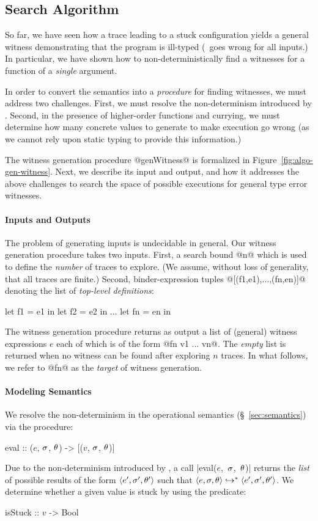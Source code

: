 \subsection{Search Algorithm}
\label{sec:search-algorithm}
%
So far, we have seen how a trace leading to a stuck configuration yields
a general witness demonstrating that the program is ill-typed (\ie\ goes
wrong for all inputs.)
In particular, we have shown how to non-deterministically find a witnesses
for a function of a \emph{single} argument.

In order to convert the semantics into a \emph{procedure} for finding
witnesses, we must address two challenges.
%
First, we must resolve the non-determinism introduced by \gensym.
%
Second, in the presence of higher-order functions and currying,
we must determine how many concrete values to generate to make
execution go wrong (as we cannot rely upon static typing to
provide this information.)

The witness generation procedure @genWitness@ is formalized in
Figure~\ref{fig:algo-gen-witness}.
%
Next, we describe its input and output, and how it
addresses the above challenges to search the space of possible
executions for general type error witnesses.

\paragraph{Inputs and Outputs}
%
The problem of generating inputs is undecidable in general.
%
Our witness generation procedure takes two inputs.
%
First, a search bound @n@ which is used to define the \emph{number} of
traces to explore. (We assume, without loss of generality, that all
traces are finite.)
%
Second, binder-expression tuples @[(f1,e1),...,(fn,en)]@
denoting the list of \emph{top-level definitions}:
%
\begin{code}
  let f1 = e1 in
  let f2 = e2 in
  ...
  let fn = en in
\end{code}
%
The witness generation procedure returns as output a list of (general)
witness expressions $e$ each of which is of the form @fn v1 ... vn@.
%
The \emph{empty} list is returned when no witness can be found after
exploring $n$ traces.
%
In what follows, we refer to @fn@ as the \emph{target} of witness generation.

\paragraph{Modeling Semantics}
%
We resolve the non-determinism in the operational semantics
(\S~\ref{sec:semantics}) via the procedure:
%
\begin{mcode}
  eval :: ($e$, $\sigma$, $\theta$) -> [($v$, $\sigma$, $\theta$)]
\end{mcode}
%
Due to the non-determinism introduced by \gensym, a call
\hbox{|eval($e$, $\sigma$, $\theta$)|} returns the \emph{list} of possible results
of the form $\langle e', \sigma', \theta' \rangle$ such that
$\langle e, \sigma, \theta \rangle \hookrightarrow^{*} \langle e', \sigma', \theta' \rangle$.
%
We determine whether a given value is stuck by using the predicate:
%
\begin{mcode}
  isStuck :: $v$ -> Bool
\end{mcode}

